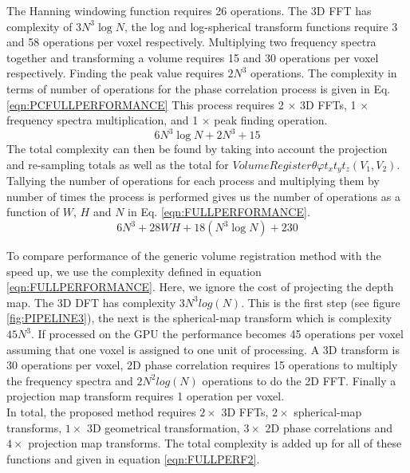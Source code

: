 The Hanning windowing function requires 26 operations. The 3D FFT has complexity of $3N^3\log{N}$, the log and log-spherical transform functions require 3 and 58 operations per voxel respectively. Multiplying two frequency spectra together and transforming a volume requires 15 and 30 operations per voxel respectively. Finding the peak value requires $2N^3$ operations. The complexity in terms of number of operations for the phase correlation process is given in Eq. \ref{eqn:PCFULLPERFORMANCE} This process requires 2 $\times$ 3D FFTs, 1 $\times$ frequency spectra multiplication, and 1 $\times$ peak finding operation. 
\begin{equation} \label{eqn:PCFULLPERFORMANCE}
6N^3\log{N} + 2N^3 + 15
\end{equation}
The total complexity can then be found by taking into account the projection and re-sampling totals as well as the total for $VolumeRegister{\theta \varphi t_x t_y t_z}(V_1, V_2)$. Tallying the number of operations for each process and multiplying them by number of times the process is performed gives us the number of operations as a function of $W$, $H$ and $N$ in Eq. \ref{eqn:FULLPERFORMANCE}.
\begin{equation} \label{eqn:FULLPERFORMANCE}
6N^3 + 28WH + 18(N^3\log{N}) + 230
\end{equation}

To compare performance of the generic volume registration method with the speed up, we use the complexity defined in equation \ref{eqn:FULLPERFORMANCE}. Here, we ignore the cost of projecting the depth map. The 3D DFT has complexity $3N^3log(N)$. This is the first step (see figure \ref{fig:PIPELINE3}), the next is the spherical-map transform which is complexity $45N^3$. If processed on the GPU the performance becomes 45 operations per voxel assuming that one voxel is assigned to one unit of processing. A 3D transform is 30 operations per voxel, 2D phase correlation requires 15 operations to multiply the frequency spectra and $2N^2log(N)$ operations to do the 2D FFT. Finally a projection map transform requires 1 operation per voxel. \\

In total, the proposed method requires $2 \times$ 3D FFTs, $2 \times$ spherical-map transforms, $1 \times$ 3D geometrical transformation, $3 \times$ 2D phase correlations and $4 \times$ projection map transforms. The total complexity is added up for all of these functions and given in equation \ref{eqn:FULLPERF2}. \\


